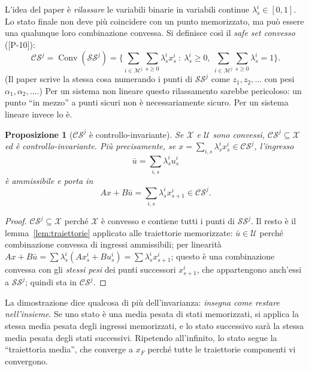 \documentclass[11pt,a4paper]{article}
\theoremstyle{definition}
\theoremstyle{plain}
\newtheorem{proposizione}[definizione]{Proposizione}
\theoremstyle{remark}
\newcommand{\Xc}{\mathcal{X}}
\newcommand{\Uc}{\mathcal{U}}
\newcommand{\SSet}{\mathcal{SS}}
\newcommand{\CS}{\mathcal{CS}}
\newcommand{\Mc}{\mathcal{M}}
\DeclareMathOperator{\Conv}{Conv}
\newcommand{\eqp}[1]{\textup{[P-#1]}}   %
\begin{document}
L'idea del paper è \emph{rilassare} le variabili binarie in variabili
continue $\lambda^i_s\in[0,1]$. Lo stato finale non deve più coincidere con un
punto memorizzato, ma può essere una qualunque loro combinazione convessa. Si
definisce così il \emph{safe set convesso} (\eqp{10}):
\begin{equation}\label{eq:CS}
  \CS^j = \Conv(\SSet^j)
  = \Big\{ \sum_{i\in\Mc^j}\sum_{s\ge 0}\lambda^i_s x^i_s\ :\
    \lambda^i_s\ge 0,\ \sum_{i\in\Mc^j}\sum_{s\ge 0}\lambda^i_s = 1 \Big\}.
\end{equation}
(Il paper scrive la stessa cosa numerando i punti di $\SSet^j$ come
$z_1,z_2,\dots$ con pesi $\alpha_1,\alpha_2,\dots$.) Per un sistema non lineare
questo rilassamento sarebbe pericoloso: un punto ``in mezzo'' a punti sicuri
non è necessariamente sicuro. Per un sistema lineare invece lo è.

\begin{proposizione}[$\CS^j$ è controllo-invariante]\label{prop:CS-invariante}
Se $\Xc$ e $\Uc$ sono convessi, $\CS^j\subseteq\Xc$ ed è
controllo-invariante. Più precisamente, se
$x=\sum_{i,s}\lambda^i_s x^i_s\in\CS^j$, l'ingresso
\begin{equation}\label{eq:ubar}
  \bar u = \sum_{i,s}\lambda^i_s u^i_s
\end{equation}
è ammissibile e porta in
\begin{equation}\label{eq:xbar}
  Ax + B\bar u = \sum_{i,s}\lambda^i_s x^i_{s+1}\in\CS^j.
\end{equation}
\end{proposizione}
\begin{proof}
$\CS^j\subseteq\Xc$ perché $\Xc$ è convesso e contiene tutti i punti di
$\SSet^j$. Il resto è il lemma~\ref{lem:traiettorie} applicato alle traiettorie
memorizzate: $\bar u\in\Uc$ perché combinazione convessa di ingressi
ammissibili; per linearità
$Ax+B\bar u=\sum\lambda^i_s(Ax^i_s+Bu^i_s)=\sum\lambda^i_s x^i_{s+1}$; questo è
una combinazione convessa con gli \emph{stessi pesi} dei punti successori
$x^i_{s+1}$, che appartengono anch'essi a $\SSet^j$; quindi sta in $\CS^j$.
\end{proof}

La dimostrazione dice qualcosa di più dell'invarianza: \emph{insegna come
restare nell'insieme}. Se uno stato è una media pesata di stati memorizzati, si
applica la stessa media pesata degli ingressi memorizzati, e lo stato
successivo sarà la stessa media pesata degli stati successivi. Ripetendo
all'infinito, lo stato segue la ``traiettoria media'', che converge a $x_F$
perché tutte le traiettorie componenti vi convergono.
\end{document}
